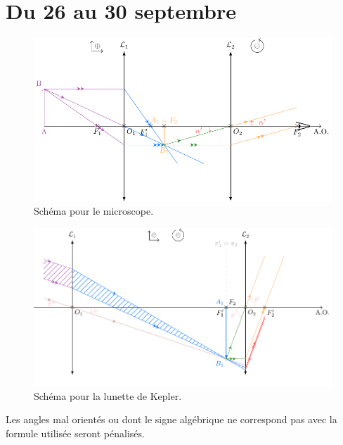\documentclass[a4paper, 12pt, final, garamond]{book}
\begin{document}
\setcounter{chapter}{2}

\chapter{Du 26 au 30 septembre}

\begin{figure}[h]
    \vspace{-20pt}
    \centering
    \includegraphics[width=\linewidth]{microscope}
    \captionsetup{justification=centering}
    \caption{Schéma pour le microscope.}
    \label{fig:micro}
\end{figure}
\begin{figure}[h]
    \vspace{-20pt}
    \centering
    \includegraphics[width=\linewidth]{kepler}
    \captionsetup{justification=centering}
    \caption{Schéma pour la lunette de Kepler.}
    \label{fig:kepler}
\end{figure}

\centering\huge Les angles mal orientés ou dont le signe algébrique ne
correspond pas avec la formule utilisée seront pénalisés.
\end{document}
